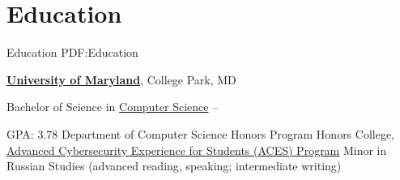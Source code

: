 
\section
{Education}
{Education}
{PDF:Education}

\href{https://umd.edu/}
{\textbf{University of Maryland}},
College Park, MD

\iffalse
\GapNoBreak
\BulletItem
Master of Science (M.S.) in 
\href {https://cs.umd.edu/}
{Computer Science}
\hfill
Expected May 2019
\begin{detail}
\SubBulletItem
Currently completing the combined B.S./M.S. program in Computer Science. 
\end{detail}
\fi 

\BulletItem
Bachelor of Science in
\href{https://cs.umd.edu/}
{Computer Science}
\hfill
{} --
\begin{detail}
\SubBulletItem
GPA: 3.78
\SubBulletItem
Department of Computer Science Honors Program
\SubBulletItem
Honors College, 
\href{https://aces.umd.edu/}
{Advanced Cybersecurity Experience for Students (ACES) Program}
\SubBulletItem
    Minor in Russian Studies (advanced reading, speaking; intermediate writing)
\end{detail}